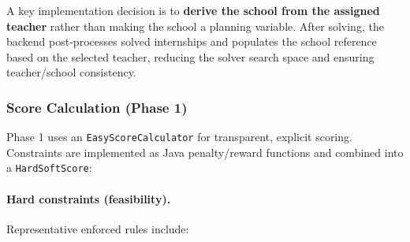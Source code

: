 \documentclass[12pt,a4paper]{report}
\begin{document}
A key implementation decision is to \textbf{derive the school from the assigned teacher} rather than making the school a planning variable. After solving, the backend post-processes solved internships and populates the school reference based on the selected teacher, reducing the solver search space and ensuring teacher/school consistency.

\subsubsection*{Score Calculation (Phase 1)}

Phase 1 uses an \texttt{EasyScoreCalculator} for transparent, explicit scoring. Constraints are implemented as Java penalty/reward functions and combined into a \texttt{HardSoftScore}:

\paragraph{Hard constraints (feasibility).}
Representative enforced rules include:
\end{document}
